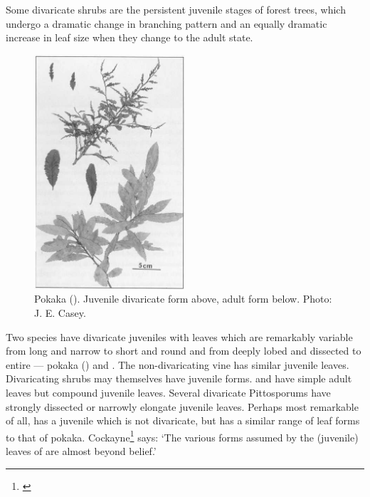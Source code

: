 Some divaricate shrubs are the persistent juvenile stages of forest trees, which undergo a dramatic change in branching pattern and an equally dramatic increase in leaf size when they change to the adult state.

\begin{figure}
	\includegraphics[width=0.5\textwidth]{graphics/figure78pokaka.jpg}
	\centering
	\caption[Pokaka]{Pokaka ().
	Juvenile divaricate form above, adult form below.
	Photo:  J. E. Casey.}%
	\label{fig:78pokaka}
\end{figure}

Two species have divaricate juveniles with leaves which are remarkably variable from long and narrow to short and round and from deeply lobed and dissected to entire --- pokaka () and .
The non-divaricating vine  has similar juvenile leaves.
Divaricating shrubs may themselves have juvenile forms.  and  have simple adult leaves but compound juvenile leaves.
Several divaricate Pittosporums have strongly dissected or narrowly elongate juvenile leaves.
Perhaps most remarkable of all,  has a juvenile which is not divaricate, but has a similar range of leaf forms to that of pokaka.
Cockayne\footnote{\cite{cockayne1899enquiry}} says: `The various forms assumed by the (juvenile) leaves of  are almost beyond belief.'


